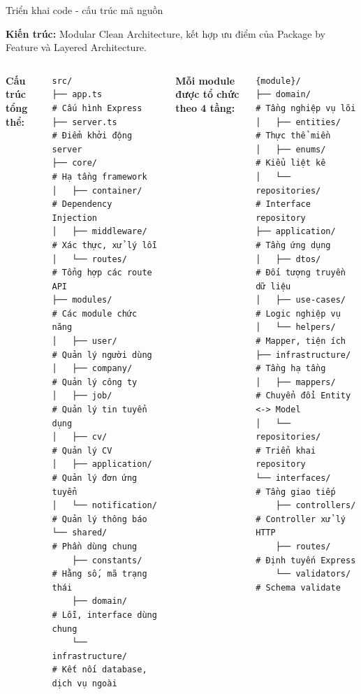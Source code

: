 \documentclass[aspectratio=169,xcolor=dvipsnames, t]{beamer}
\begin{document}
\begin{frame}[fragile]{Triển khai code - cấu trúc mã nguồn}
\justifying

\textbf{Kiến trúc:} Modular Clean Architecture, kết hợp ưu điểm
của Package by Feature và Layered Architecture.
\begin{columns}[T]
\tiny
\vspace{0.2cm}
\textbf{Cấu trúc tổng thể:}
\begin{verbatim}
src/
├── app.ts                    # Cấu hình Express
├── server.ts                 # Điểm khởi động server
├── core/                     # Hạ tầng framework
│   ├── container/            # Dependency Injection
│   ├── middleware/           # Xác thực, xử lý lỗi
│   └── routes/               # Tổng hợp các route API
├── modules/                  # Các module chức năng
│   ├── user/                 # Quản lý người dùng
│   ├── company/              # Quản lý công ty
│   ├── job/                  # Quản lý tin tuyển dụng
│   ├── cv/                   # Quản lý CV
│   ├── application/          # Quản lý đơn ứng tuyển
│   └── notification/         # Quản lý thông báo
└── shared/                   # Phần dùng chung
    ├── constants/            # Hằng số, mã trạng thái
    ├── domain/               # Lỗi, interface dùng chung
    └── infrastructure/       # Kết nối database, dịch vụ ngoài
\end{verbatim}

\vspace{0.2cm}
\tiny
\textbf{Mỗi module được tổ chức theo 4 tầng:}
\begin{verbatim}
{module}/
├── domain/                   # Tầng nghiệp vụ lõi
│   ├── entities/             # Thực thể miền
│   ├── enums/                # Kiểu liệt kê
│   └── repositories/         # Interface repository 
├── application/              # Tầng ứng dụng
│   ├── dtos/                 # Đối tượng truyền dữ liệu
│   ├── use-cases/            # Logic nghiệp vụ
│   └── helpers/              # Mapper, tiện ích
├── infrastructure/           # Tầng hạ tầng
│   ├── mappers/              # Chuyển đổi Entity <-> Model
│   └── repositories/         # Triển khai repository
└── interfaces/               # Tầng giao tiếp
    ├── controllers/          # Controller xử lý HTTP
    ├── routes/               # Định tuyến Express
    └── validators/           # Schema validate 
\end{verbatim}

\end{columns}
\end{frame}
\end{document}
